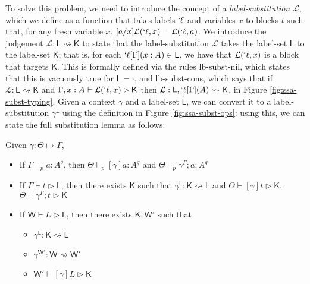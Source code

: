 \documentclass[acmsmall,screen,review]{acmart}
\newcommand{\mc}[1]{\ensuremath{\mathcal{#1}}}
\newcommand{\ms}[1]{\ensuremath{\mathsf{#1}}}
\newcommand{\lbl}[1]{{`#1}}
\newcommand{\thyp}[3]{#1: {#2}^{#3}}
\newcommand{\lhyp}[3]{#1[#2](#3)}
\newcommand{\rle}[1]{{\scriptsize\textsf{#1}}}
\newcommand{\hasty}[5]{#1 \vdash_{#2} #3: {#4}^{#5}}
\newcommand{\haslb}[3]{#1 \vdash #2 \rhd #3}
\newcommand{\lhaslb}[3]{#1 \vdash #2 \rhd #3}
\newcommand{\issubst}[3]{#1: #2 \mapsto #3}
\newcommand{\lbsubst}[3]{#1: #2 \rightsquigarrow #3}
\newcommand{\exprletsubst}[2]{{#1};{#2}}
\newcommand{\stmtletsubst}[2]{{#1};{#2}}
\newcommand{\substctx}[2]{{#1}^{#2}}
\newcommand{\substlbs}[2]{{#1}^{#2}}
\begin{document}
To solve this problem, we need to introduce the concept of a
\textit{label-substitution} \(\mc{L}\), which we define as a function that takes
labels \(\lbl{\ell}\) and variables \(x\) to blocks \(t\) such that, for any
fresh variable \(x\), \([a/x]\mc{L}(\lbl{\ell}, x) = \mc{L}(\lbl{\ell}, a)\). We
introduce the judgement \(\lbsubst{\mc{L}}{\ms{L}}{\ms{K}}\) to state that the
label-substitution \(\mc{L}\) takes the label-set \(\ms{L}\) to the label-set
\(\ms{K}\); that is, for each \(\lbl{\ell}[\Gamma](x: A) \in \ms{L}\), we have
that \(\mc{L}(\lbl{\ell}, x)\) is a block that targets \(\ms{K}\). This is
formally defined via the rules \rle{lb-subst-nil}, which states that this is
vacuously true for \(\ms{L} = \cdot\), and \rle{lb-subst-cons}, which says that
if \(\lbsubst{\mc{L}}{\ms{L}}{\ms{K}}\) and \(\haslb{\Gamma,
\thyp{x}{A}{}}{\mc{L}(\lbl{\ell}, x)}{\ms{K}}\) then \(\lbsubst{\mc{L}}{\ms{L},
\lhyp{\lbl{\ell}}{\Gamma}{A}}{\ms{K}}\), in Figure \ref{fig:ssa-subst-typing}.
Given a context \(\gamma\) and a label-set \(\ms{L}\), we can convert it to a
label-substitution \(\substlbs{\gamma}{\ms{L}}\) using the definition in Figure
\ref{fig:ssa-subst-ops}: using this, we can state the full substitution lemma as
follows:
\begin{lemma}[Substitution] 
  Given \(\issubst{\gamma}{\Theta}{\Gamma}\),
  \begin{itemize}
    \item If \(\hasty{\Gamma}{p}{a}{A}{q}\), then
    \(\hasty{\Theta}{p}{[\gamma]a}{A}{q}\) and
    \(\hasty{\Theta}{p}{\exprletsubst{\substctx{\gamma}{\Gamma}}{a}}{A}{q}\)
    \item If \(\haslb{\Gamma}{t}{\ms{L}}\), then there exists \(\ms{K}\) such
    that \(\lbsubst{\substlbs{\gamma}{\ms{L}}}{\ms{K}}{\ms{L}}\) and
    \(\haslb{\Theta}{[\gamma]t}{\ms{K}}\),
    \(\haslb{\Theta}{\stmtletsubst{\substctx{\gamma}{\Gamma}}{t}}{\ms{K}}\)
    \item If \(\lhaslb{\ms{W}}{L}{\ms{L}}\), then there exists \(\ms{K},
    \ms{W}'\) such that 
    \begin{itemize}
      \item \(\lbsubst{\substlbs{\gamma}{\ms{L}}}{\ms{K}}{\ms{L}}\) 
      \item \(\lbsubst{\substlbs{\gamma}{\ms{W}'}}{\ms{W}}{\ms{W}'}\) 
      \item \(\lhaslb{\ms{W}'}{[\gamma]L}{\ms{K}}\)
    \end{itemize}
  \end{itemize}
\end{lemma}
\end{document}
